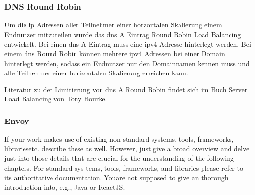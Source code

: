 \subsubsection{DNS Round Robin}
Um die \ac{ip} Adressen aller Teilnehmer einer horzontalen Skalierung einem Endnutzer mitzuteilen wurde das \ac{dns} A Eintrag Round Robin Load Balancing entwickelt. Bei einen \ac{dns} A Eintrag muss eine \ac{ip}v4 Adresse hinterlegt werden. Bei einem \ac{dns} Round Robin können mehrere \ac{ip}v4 Adressen bei einer Domain hinterlegt werden, sodass ein Endnutzer nur den Domainnamen kennen muss und alle Teilnehmer einer horizontalen Skalierung erreichen kann.

Literatur zu der Limitierung von \ac{dns} A Round Robin findet sich im Buch Server Load Balancing von Tony Bourke.\cite{bourkeServerLoadBalancing2001}

\subsubsection{Envoy}

If your work makes use of existing non-standard systems, tools, frameworks, librariesetc. describe these as well. However, just give a broad overview and delve just into those details that are crucial for the understanding of the following chapters. For standard sys-tems, tools, frameworks, and libraries please refer to its authoritative documentation. Youare not supposed to give an thorough introduction into, e.g., Java or ReactJS.

